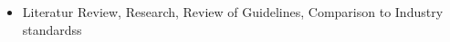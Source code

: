 \begin{itemize}
	\item Literatur Review, Research, Review of Guidelines, Comparison to Industry standardss
\end{itemize}